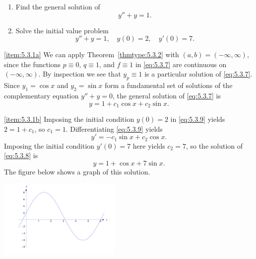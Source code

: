 \documentclass{ximera}
\begin{document}
\begin{example}\label{example:5.3.1} 
\begin{enumerate}
\item \label{item:5.3.1a} %
Find the general solution of
\begin{equation} \label{eq:5.3.7}
y''+y=1.
\end{equation}
\item \label{item:5.3.1b} %
Solve the initial value problem
\begin{equation} \label{eq:5.3.8}
y''+y=1, \quad  y(0)=2,\quad y'(0)=7.
\end{equation}
\end{enumerate}


\begin{explanation} \ref{item:5.3.1a}
We can apply Theorem~\ref{thmtype:5.3.2} with $(a,b)= (-\infty,\infty)$,
since the functions $p\equiv0$, $q\equiv1$, and $f\equiv1$ in
\eqref{eq:5.3.7} are continuous on $(-\infty,\infty)$. By inspection we
see that $y_p\equiv1$ is a particular solution of \eqref{eq:5.3.7}. Since
$y_1=\cos x$ and $y_2=\sin x$ form a fundamental set of solutions of
the complementary equation $y''+y=0$, the general solution of
\eqref{eq:5.3.7} is
\begin{equation} \label{eq:5.3.9}
y=1+c_1\cos x+c_2\sin x.
\end{equation}

\ref{item:5.3.1b}
Imposing the initial condition $y(0)=2$ in \eqref{eq:5.3.9} yields
$2=1+c_1$, so $c_1=1$. Differentiating \eqref{eq:5.3.9} yields
$$
y'=-c_1\sin x+c_2\cos x.
$$
Imposing the initial condition $y'(0)=7$ here yields $c_2=7$,
so the solution of \eqref{eq:5.3.8} is
$$
y=1+\cos x+7\sin x.
$$
The figure below shows a graph of this solution.


\begin{image}
  \includegraphics[height=1.5in]{fig050301.jpg} 
\end{image}

\end{explanation}
\end{example}
\end{document}

